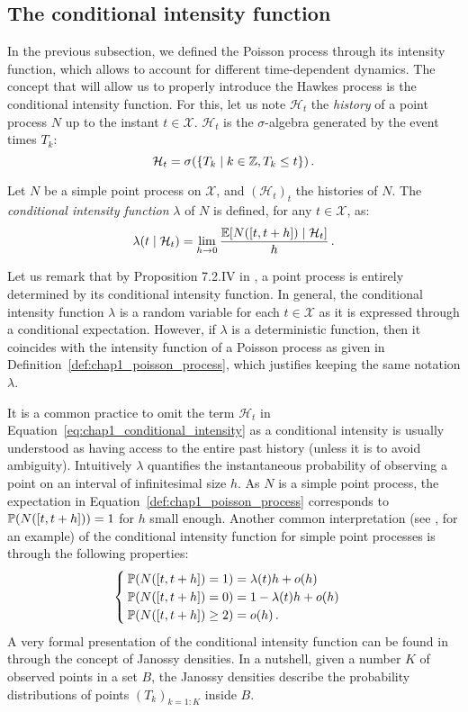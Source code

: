 \subsection{The conditional intensity function}

In the previous subsection, we defined the Poisson process through its intensity function, which allows to account for different time-dependent dynamics.
The concept that will allow us to properly introduce the Hawkes process is the conditional intensity function.
For this, let us note $\mathcal{H}_t$ the \emph{history} of a point process $N$ up to the instant $t\in\mathcal{X}$. 
$\mathcal{H}_t$ is the $\sigma$-algebra generated by the event times $T_k$:
\[\mathcal{H}_t = \sigma(\{T_k \mid k\in{\mathbb Z}, T_k \leq t\})\,.\]

\begin{definition}\label{def:chap1_conditional_intensity}
    Let $N$ be a simple point process on $\mathcal{X}$, and $(\mathcal{H}_t)_{t}$ the histories of $N$.
    The \emph{conditional intensity function} $\lambda$ of $N$ is defined, for any $t\in\mathcal{X}$, as:
    \begin{equation}\label{eq:chap1_conditional_intensity}
        \lambda(t \mid \mathcal{H}_t) = \lim_{h \to 0}{\frac{{\mathbb E}[N([t,t+h]) \mid \mathcal{H}_t]}{h}}\,.
    \end{equation}
\end{definition}
Let us remark that by Proposition 7.2.IV in \textcite{DaleyV1}, a point process is entirely determined by its conditional intensity function.
In general, the conditional intensity function $\lambda$ is a random variable for each $t\in\mathcal{X}$ as it is expressed through a conditional expectation.
However, if $\lambda$ is a deterministic function, then it coincides with the intensity function of a Poisson process as given in Definition~\ref{def:chap1_poisson_process}, which justifies keeping the same notation $\lambda$. 

It is a common practice to omit the term $\mathcal{H}_t$ in Equation~\eqref{eq:chap1_conditional_intensity} as a conditional intensity is usually understood as having access to the entire past history (unless it is to avoid ambiguity).
Intuitively $\lambda$ quantifies the instantaneous probability of observing a point on an interval of infinitesimal size $h$.
As $N$ is a simple point process, the expectation in Equation~\eqref{def:chap1_poisson_process} corresponds to ${\mathbb P}(N([t, t+h])) = 1$ for $h$ small enough.
Another common interpretation (see \textcite{Hawkes1971}, for an example) of the conditional intensity function for simple point processes is through the following properties:
\[
    \begin{cases}
{\mathbb P}(N([t, t+h]) = 1) = \lambda(t) h + o(h)\\
{\mathbb P}(N([t, t+h]) = 0) = 1 - \lambda(t) h + o(h)\\
{\mathbb P}(N([t, t+h]) \geq 2)= o(h)\,.
    \end{cases}
\]
A very formal presentation of the conditional intensity function can be found in \textcite[Chapter 7]{DaleyV1} through the concept of Janossy densities.
In a nutshell, given a number $K$ of observed points in a set $B$, the Janossy densities describe the probability distributions of points $(T_k)_{k=1:K}$ inside $B$.

